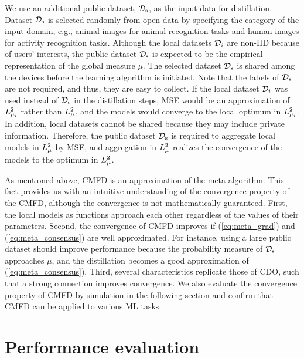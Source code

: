 \documentclass[journal]{IEEEtran}
\begin{document}
We use an additional public dataset, $\sharedD$, as the input data for distillation.
Dataset $\sharedD$ is selected randomly from open data by specifying the category of the input domain,
e.g., animal images for animal recognition tasks and human images for activity recognition tasks.
Although the local datasets $\Dsi$ are non-\gls{IID} because of users' interests,
the public dataset $\sharedD$ is expected to be the empirical representation of the global measure $\mu$.
The selected dataset $\sharedD$ is shared among the devices before the learning algorithm is initiated.
Note that the labels of $\sharedD$ are not required, and thus, they are easy to collect.
If the local dataset $\Dsi$ was used instead of $\sharedD$ in the distillation steps,
\gls{MSE} would be an approximation of $\LSpc[\mu_i]$ rather than $\LSpc$,
and the models would converge to the local optimum in $\LSpc[\mu_i]$.
In addition, local datasets cannot be shared because they may include private information.
Therefore, the public dataset $\sharedD$ is required to aggregate local models in $\LSpc$ by \gls{MSE},
and aggregation in $\LSpc$ realizes the convergence of the models to the optimum in $\LSpc$. 

As mentioned above, \gls{CMFD} is an approximation of the meta-algorithm.
This fact provides us with an intuitive understanding of the convergence property of the \gls{CMFD},
although the convergence is not mathematically guaranteed.
First, the local models as functions approach each other regardless of the values of their parameters.
Second, the convergence of \gls{CMFD} improves if (\ref{eq:meta_grad}) and (\ref{eq:meta_consensus}) are well approximated.
For instance, using a large public dataset should improve performance
because the probability measure of $\sharedD$ approaches $\mu$,
and the distillation becomes a good approximation of (\ref{eq:meta_consensus}).
Third, several characteristics replicate those of \gls{CDO}, such that a strong connection improves convergence.
We also evaluate the convergence property of \gls{CMFD} by simulation in the following section
and confirm that \gls{CMFD} can be applied to various \gls{ML} tasks.

\section{Performance evaluation} \label{sec:evaluation}
\end{document}
